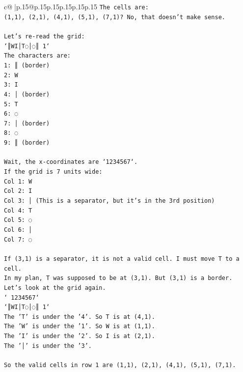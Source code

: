 \documentclass{article}
\begin{document}
{\begin{supertabular}{c@{$\;$}|p{.15\linewidth}@{}p{.15\linewidth}p{.15\linewidth}p{.15\linewidth}p{.15\linewidth}p{.15\linewidth}}
{{{\texttt{The cells are:} \\
\texttt{(1,1), (2,1), (4,1), (5,1), (7,1)? No, that doesn't make sense.} \\
\\ 
\texttt{Let's re{-}read the grid:} \\
\texttt{`║WI│T◌│◌║ 1`} \\
\texttt{The characters are:} \\
\texttt{1: ║ (border)} \\
\texttt{2: W} \\
\texttt{3: I} \\
\texttt{4: │ (border)} \\
\texttt{5: T} \\
\texttt{6: ◌} \\
\texttt{7: │ (border)} \\
\texttt{8: ◌} \\
\texttt{9: ║ (border)} \\
\\ 
\texttt{Wait, the x{-}coordinates are `1234567`.} \\
\texttt{If the grid is 7 units wide:} \\
\texttt{Col 1: W} \\
\texttt{Col 2: I} \\
\texttt{Col 3: │ (This is a separator, but it's in the 3rd position)} \\
\texttt{Col 4: T} \\
\texttt{Col 5: ◌} \\
\texttt{Col 6: │} \\
\texttt{Col 7: ◌} \\
\\ 
\texttt{If (3,1) is a separator, it is not a valid cell. I must move T to a cell.} \\
\texttt{In my plan, T was supposed to be at (3,1). But (3,1) is a border.} \\
\texttt{Let's look at the grid again.} \\
\texttt{` 1234567`} \\
\texttt{`║WI│T◌│◌║ 1`} \\
\texttt{The 'T' is under the '4'. So T is at (4,1).} \\
\texttt{The 'W' is under the '1'. So W is at (1,1).} \\
\texttt{The 'I' is under the '2'. So I is at (2,1).} \\
\texttt{The '│' is under the '3'.} \\
\\ 
\texttt{So the valid cells in row 1 are (1,1), (2,1), (4,1), (5,1), (7,1).} \\
}}}
\end{supertabular}}
\end{document}
